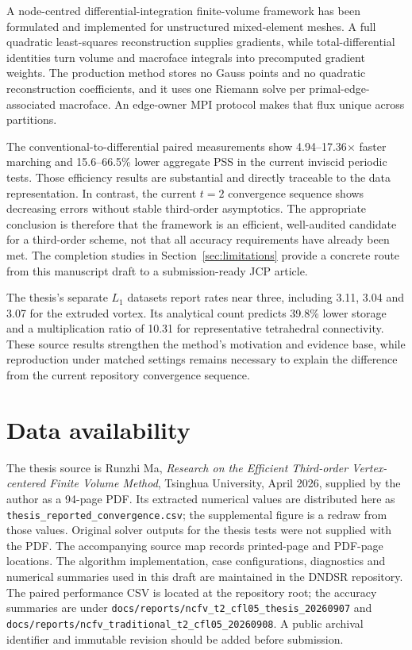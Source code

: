 \documentclass[11pt]{article}
\begin{document}
A node-centred differential-integration finite-volume framework has been formulated and implemented for unstructured mixed-element meshes.  A full quadratic least-squares reconstruction supplies gradients, while total-differential identities turn volume and macroface integrals into precomputed gradient weights.  The production method stores no Gauss points and no quadratic reconstruction coefficients, and it uses one Riemann solve per primal-edge-associated macroface.  An edge-owner MPI protocol makes that flux unique across partitions.

The conventional-to-differential paired measurements show 4.94--17.36$\times$ faster marching and 15.6--66.5\% lower aggregate PSS in the current inviscid periodic tests.  Those efficiency results are substantial and directly traceable to the data representation.  In contrast, the current $t=2$ convergence sequence shows decreasing errors without stable third-order asymptotics.  The appropriate conclusion is therefore that the framework is an efficient, well-audited candidate for a third-order scheme, not that all accuracy requirements have already been met.  The completion studies in Section~\ref{sec:limitations} provide a concrete route from this manuscript draft to a submission-ready JCP article.

The thesis's separate $L_1$ datasets report rates near three, including 3.11, 3.04 and 3.07 for the extruded vortex.  Its analytical count predicts 39.8\% lower storage and a multiplication ratio of 10.31 for representative tetrahedral connectivity.  These source results strengthen the method's motivation and evidence base, while reproduction under matched settings remains necessary to explain the difference from the current repository convergence sequence.

\section*{Data availability}
The thesis source is Runzhi Ma, \emph{Research on the Efficient Third-order Vertex-centered Finite Volume Method}, Tsinghua University, April 2026, supplied by the author as a 94-page PDF.  Its extracted numerical values are distributed here as \texttt{thesis\_reported\_convergence.csv}; the supplemental figure is a redraw from those values.  Original solver outputs for the thesis tests were not supplied with the PDF.  The accompanying source map records printed-page and PDF-page locations.
The algorithm implementation, case configurations, diagnostics and numerical summaries used in this draft are maintained in the DNDSR repository.  The paired performance CSV is located at the repository root; the accuracy summaries are under \texttt{docs/reports/ncfv\_t2\_cfl05\_thesis\_20260907} and \texttt{docs/reports/ncfv\_traditional\_t2\_cfl05\_20260908}.  A public archival identifier and immutable revision should be added before submission.
\end{document}
